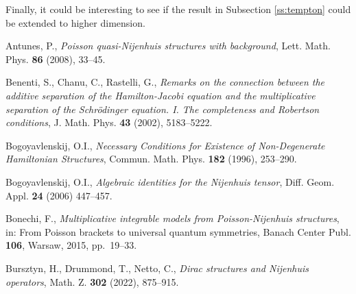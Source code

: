 \documentclass[12pt]{article}
\newcommand{\todo}[1]{
\vspace{5 mm}\par \noindent 
\framebox{
\begin{minipage}[c]{0.9 \textwidth} \small \tt #1
\flushright ...ToDo
\end{minipage}}
\vspace{5 mm}\par
}
\newcommand{\blu}[1]{\textcolor{blue}{#1}}
\begin{document}
Finally, it could be interesting to see if the result  in Subsection \ref{ss:tempton}
could be extended to higher dimension.





Antunes, P., {\it Poisson quasi-Nijenhuis structures with background}, Lett. Math. Phys. {\bf 86} (2008), 33--45.

 Benenti, S., Chanu, C., Rastelli, G., {\it Remarks on the connection between the additive separation of the Hamilton-Jacobi equation and the multiplicative separation of the Schr\"odinger equation. I. The completeness and Robertson conditions}, J. Math. Phys. {\bf 43} (2002), 5183--5222.

  Bogoyavlenskij, O.I., {\it Necessary Conditions for Existence of Non-Degenerate Hamiltonian Structures}, Commun. Math. Phys. {\bf 182} (1996), 253--290.

 Bogoyavlenskij, O.I., {\it Algebraic identities for the Nijenhuis tensor}, Diff. Geom. Appl. {\bf 24} (2006) 447--457.


 Bonechi, F., {\it  Multiplicative integrable models from Poisson-Nijenhuis structures}, in: {\rm From Poisson brackets to universal quantum symmetries}, Banach Center Publ. {\bf 106}, Warsaw, 2015, pp.\ 19--33.


 Bursztyn, H., Drummond, T., Netto, C.,
{\it Dirac structures and Nijenhuis operators}, Math. Z. {\bf 302} (2022), 875--915.
\end{document}
